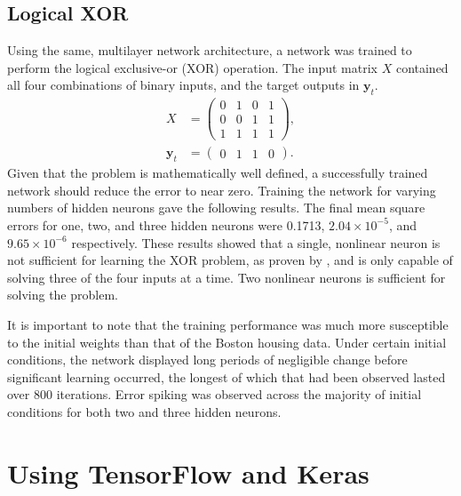 \subsection{Logical XOR}

Using the same, multilayer network architecture, a network was trained to
perform the logical exclusive-or (XOR) operation.
The input matrix $X$ contained all four combinations of binary inputs, and the
target outputs in $\mathbf{y}_t$.
\begin{align*}
    X &= \begin{pmatrix}
        0 & 1 & 0 & 1 \\
        0 & 0 & 1 & 1 \\
        1 & 1 & 1 & 1
    \end{pmatrix},\\
    \mathbf{y}_t &= \begin{pmatrix}
        0 & 1 & 1 & 0
    \end{pmatrix}.
\end{align*}
Given that the problem is mathematically well defined, a successfully trained
network should reduce the error to near zero.
Training the network for varying numbers of hidden neurons gave the following
results.
The final mean square errors for one, two, and three hidden neurons were 0.1713,
$2.04\times10^{-5}$, and $9.65\times10^{-6}$ respectively.
These results showed that a single, nonlinear neuron is not sufficient for
learning the XOR problem, as proven by \cite{Minsky:1969:Perceptrons}, and is
only capable of solving three of the four inputs at a time.
Two nonlinear neurons is sufficient for solving the problem.

It is important to note that the training performance was much more susceptible
to the initial weights than that of the Boston housing data.
Under certain initial conditions, the network displayed long periods of
negligible change before significant learning occurred, the longest of which
that had been observed lasted over 800 iterations.
Error spiking was observed across the majority of initial conditions for both
two and three hidden neurons.



\section{Using TensorFlow and Keras}

